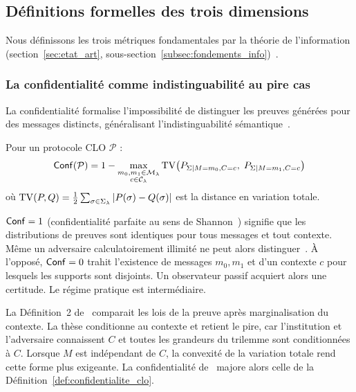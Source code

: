 \subsection{D\'efinitions formelles des trois dimensions}
\label{subsec:trois_dimensions}
\begin{sloppypar}
Nous d\'efinissons les trois m\'etriques fondamentales par la th\'eorie
de l'information (section~\ref{sec:etat_art},
sous-section~\ref{subsec:fondements_info})~\cite{Shannon48,CoverThomas06,HanVerdu}.

\subsubsection{La confidentialit\'e comme indistinguabilit\'e au pire cas}
\label{subsubsec:confidentialite_clo}

La confidentialit\'e formalise l'impossibilit\'e de distinguer les preuves
g\'en\'er\'ees pour des messages distincts, g\'en\'eralisant l'indistinguabilit\'e
s\'emantique~\cite{GoldwasserMicali84}.

\begin{definition}[Confidentialit\'e]\label{def:confidentialite_clo}
Pour un protocole CLO $\mathcal{P}$ :
\begin{equation}
\mathsf{Conf}(\mathcal{P}) = 1 - \max_{\substack{m_0, m_1 \in \mathcal{M}_\lambda \\ c \in \mathcal{C}_\lambda}}
\operatorname{TV}\!\left(P_{\Sigma|M=m_0,C=c},\; P_{\Sigma|M=m_1,C=c}\right)
\label{eq:conf_clo}
\end{equation}
o\`u $\operatorname{TV}(P, Q) = \frac{1}{2} \sum_{\sigma \in \Sigma_\lambda} |P(\sigma) - Q(\sigma)|$
est la distance en variation totale.
\end{definition}

$\mathsf{Conf} = 1$ (confidentialit\'e parfaite au sens de Shannon~\cite{Shannon49,Shannon48})
signifie que les distributions de preuves sont identiques pour tous
messages et tout contexte. M\^eme un adversaire calculatoirement
illimit\'e ne peut alors distinguer~\cite{Wyner75,WynerZiv76}. \`A l'oppos\'e, $\mathsf{Conf} = 0$ trahit l'existence
de messages $m_0, m_1$ et d'un contexte $c$ pour lesquels les supports
sont disjoints. Un observateur passif acquiert alors une certitude.
Le r\'egime pratique est interm\'ediaire.

La D\'efinition~2 de~\cite{MINKA2026CLO} comparait les lois de la preuve apr\`es
marginalisation du contexte. La th\`ese conditionne au contexte et retient le pire, car
l'institution et l'adversaire connaissent $C$ et toutes les grandeurs du trilemme sont
conditionn\'ees \`a $C$. Lorsque $M$ est ind\'ependant de $C$, la convexit\'e de la variation
totale rend cette forme plus exigeante. La confidentialit\'e de~\cite{MINKA2026CLO} majore
alors celle de la D\'efinition~\ref{def:confidentialite_clo}.


\end{sloppypar}
